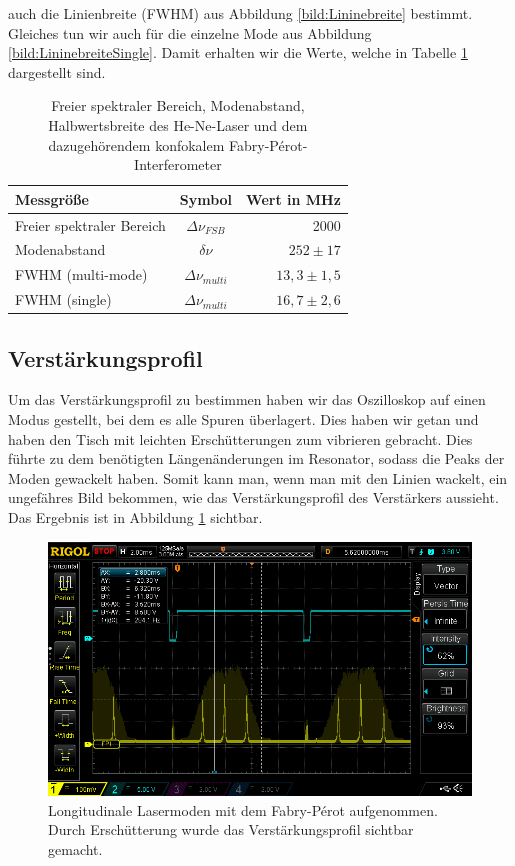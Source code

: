 auch die Linienbreite (FWHM) aus Abbildung \ref{bild:Lininebreite} bestimmt. Gleiches tun wir auch für die einzelne Mode
aus Abbildung \ref{bild:LininebreiteSingle}. Damit erhalten wir die Werte, welche in Tabelle \ref{tab:Linienbreite} dargestellt sind.

\begin{table}
    \centering
 
    \begin{tabular}{lcr}
        \toprule
        Messgröße & Symbol & Wert in MHz\\
        \midrule
        Freier spektraler Bereich& $\Delta \nu_{FSB}$ & 2000\\
        Modenabstand& $\delta\nu$& $252 \pm 17$\\
        FWHM (multi-mode)& $\Delta\nu_{multi}$&$13,3 \pm 1,5$\\
        FWHM (single)& $\Delta\nu_{multi}$&$16,7 \pm 2,6$\\
        \bottomrule        
    \end{tabular}
  
    \caption{Freier spektraler Bereich, Modenabstand, Halbwertsbreite des He-Ne-Laser und dem dazugehörendem 
    konfokalem Fabry-Pérot-Interferometer}
    \label{tab:Linienbreite}
\end{table}


\subsection*{Verstärkungsprofil}

Um das Verstärkungsprofil zu bestimmen haben wir das Oszilloskop auf einen Modus gestellt, bei dem es alle Spuren 
überlagert. Dies haben wir getan und haben den Tisch mit leichten Erschütterungen zum vibrieren gebracht.
Dies führte zu dem benötigten Längenänderungen im Resonator, sodass die Peaks der Moden gewackelt haben.
Somit kann man, wenn man mit den Linien wackelt, ein ungefähres Bild bekommen, wie das Verstärkungsprofil
des Verstärkers aussieht. Das Ergebnis ist in Abbildung \ref{bild:Verstaerkung} sichtbar.

\begin{figure}[h]
    \centering
    \includegraphics[width = \linewidth]{Bilder/Auswertung/FabryPerotVerst.png}
    \caption{Longitudinale Lasermoden mit dem Fabry-Pérot aufgenommen. Durch Erschütterung wurde das Verstärkungsprofil sichtbar gemacht.}
    \label{bild:Verstaerkung}
\end{figure}

